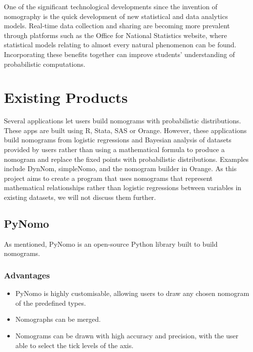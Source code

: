 \documentclass{l4proj}
\begin{document}
One of the significant technological developments since the invention of nomography is the quick development of new statistical and data analytics models. Real-time data collection and sharing are becoming more prevalent through platforms such as the Office for National Statistics website, where statistical models relating to almost every natural phenomenon can be found. Incorporating these benefits together can improve students' understanding of probabilistic computations. 


\section{Existing Products}

Several applications let users build nomograms with probabilistic distributions. These apps are built using R, Stata, SAS or Orange. However, these applications build nomograms from logistic regressions and Bayesian analysis of datasets provided by users rather than using a mathematical formula to produce a nomogram and replace the fixed points with probabilistic distributions. Examples include DynNom, simpleNomo, and the nomogram builder in Orange. \citep{hutchison_nomograms_2004} As this project aims to create a program that uses nomograms that represent mathematical relationships rather than logistic regressions between variables in existing datasets, we will not discuss them further. 


\subsection{PyNomo} \label{PyNomo}

As mentioned, PyNomo is an open-source Python library built to build nomograms. 

\subsubsection{{Advantages}}

\begin{itemize}
    \item PyNomo is highly customisable, allowing users to draw any chosen nomogram of the predefined types.  
    \item Nomographs can be merged. 
    \item Nomograms can be drawn with high accuracy and precision, with the user able to select the tick levels of the axis. 
\end{itemize}
\end{document}

